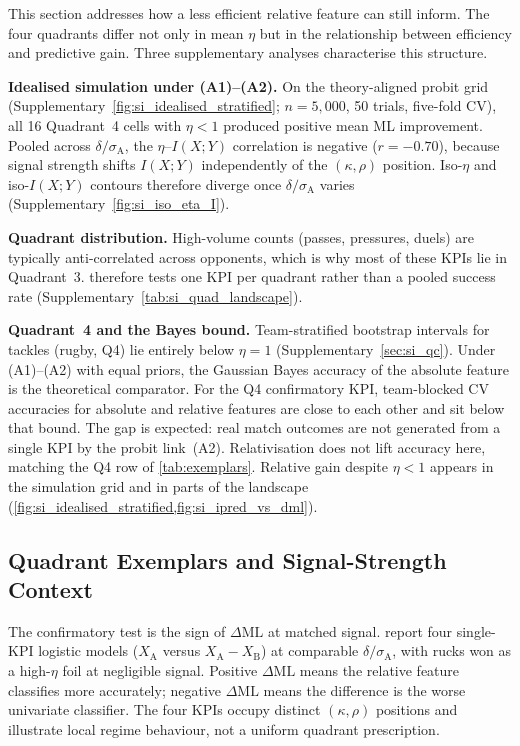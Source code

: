 This section addresses how a less efficient relative feature can still inform. The four quadrants differ not only in mean $\eta$ but in the relationship between efficiency and predictive gain. Three supplementary analyses characterise this structure.

\textbf{Idealised simulation under (A1)--(A2).} On the theory-aligned probit grid (Supplementary~\cref{fig:si_idealised_stratified}; $n=5{,}000$, 50 trials, five-fold CV), all 16 Quadrant~4 cells with $\eta<1$ produced positive mean ML improvement. Pooled across $\delta/\sigma_{\mathrm{A}}$, the $\eta$--$I(X;Y)$ correlation is negative ($r=-0.70$), because signal strength shifts $I(X;Y)$ independently of the $(\kappa,\rho)$ position. Iso-$\eta$ and iso-$I(X;Y)$ contours therefore diverge once $\delta/\sigma_{\mathrm{A}}$ varies (Supplementary~\cref{fig:si_iso_eta_I}).

\textbf{Quadrant distribution.} High-volume counts (passes, pressures, duels) are typically anti-correlated across opponents, which is why most of these KPIs lie in Quadrant~3.  therefore tests one KPI per quadrant rather than a pooled success rate (Supplementary~\cref{tab:si_quad_landscape}).

\textbf{Quadrant~4 and the Bayes bound.} Team-stratified bootstrap intervals for tackles (rugby, Q4) lie entirely below $\eta=1$ (Supplementary~\cref{sec:si_qc}). Under (A1)--(A2) with equal priors, the Gaussian Bayes accuracy of the absolute feature is the theoretical comparator. For the Q4 confirmatory KPI, team-blocked CV accuracies for absolute and relative features are close to each other and sit below that bound. The gap is expected: real match outcomes are not generated from a single KPI by the probit link~(A2). Relativisation does not lift accuracy here, matching the Q4 row of \cref{tab:exemplars}. Relative gain despite $\eta<1$ appears in the simulation grid and in parts of the landscape (\cref{fig:si_idealised_stratified,fig:si_ipred_vs_dml}).

\subsection{Quadrant Exemplars and Signal-Strength Context}
\label{sec:exemplars}

The confirmatory test is the sign of $\Delta\mathrm{ML}$ at matched signal.  report four single-KPI logistic models ($X_{\mathrm{A}}$ versus $X_{\mathrm{A}}-X_{\mathrm{B}}$) at comparable $\delta/\sigma_{\mathrm{A}}$, with rucks won as a high-$\eta$ foil at negligible signal. Positive $\Delta\mathrm{ML}$ means the relative feature classifies more accurately; negative $\Delta\mathrm{ML}$ means the difference is the worse univariate classifier. The four KPIs occupy distinct $(\kappa,\rho)$ positions and illustrate local regime behaviour, not a uniform quadrant prescription.

